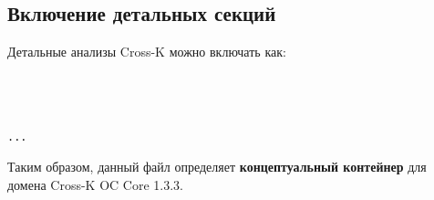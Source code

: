 \subsection{Включение детальных секций}
\noindent Детальные анализы Cross-K можно включать как:
\begin{verbatim}



...

\end{verbatim}

\noindent Таким образом, данный файл определяет \textbf{концептуальный контейнер}
для домена Cross-K OC Core 1.3.3.
